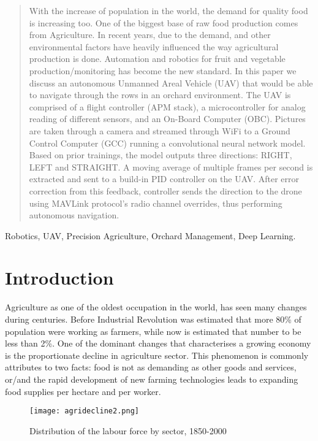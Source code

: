 \documentclass[conference]{IEEEtran}
\begin{document}
\begin{abstract}
With the increase of population in the world, the demand for quality food is increasing too. One of the biggest base of raw food production comes from Agriculture. In recent years, due to the demand, and other environmental factors have heavily influenced the way agricultural production is done. Automation and robotics for fruit and vegetable production/monitoring has become the new standard. In this paper we discuss an autonomous Unmanned Areal Vehicle (UAV) that would be able to navigate through the rows in an orchard environment. The UAV is comprised of a flight controller (APM stack), a microcontroller for analog reading of different sensors, and an On-Board Computer (OBC). Pictures are taken through a camera and streamed through WiFi to a Ground Control Computer (GCC) running a convolutional neural network model. Based on prior trainings, the model outputs three directions: RIGHT, LEFT and STRAIGHT. A moving average of multiple frames per second is extracted and sent to a build-in PID controller on the UAV. After error correction from this feedback, controller sends the direction to the drone using MAVLink protocol's radio channel overrides, thus performing autonomous navigation.
\end{abstract}

\begin{IEEEkeywords}
Robotics, UAV, Precision Agriculture, Orchard Management, Deep Learning.
\end{IEEEkeywords}

\section{Introduction}

Agriculture as one of the oldest occupation in the world, has seen many changes during centuries. Before Industrial Revolution was estimated that more 80\% of population were working as farmers, while now is estimated that number to be less than 2\%. One of the dominant changes that characterises a growing economy is the proportionate decline in agriculture sector. This phenomenon is commonly attributes to two facts: food is not as demanding as other goods and services, or/and the rapid development of new farming technologies leads to expanding food supplies per hectare and per worker.

\begin{figure}[thpb]
      \centering
      \texttt{[image: agridecline2.png]}
      \caption{Distribution of the labour force by sector, 1850-2000}
      \label{fig:robot1}
\end{figure}
\end{document}
